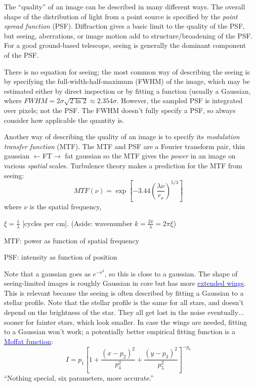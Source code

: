 \documentclass[12pt]{article}
\begin{document}
The ``quality'' of an image can be described in many different ways.
The overall shape of the distribution of light from a point source is
specified by the \emph{point spread function} (PSF). Diffraction gives a basic
limit to the quality of the PSF, but seeing, aberrations, or image
motion add to structure/broadening of the PSF\@. For a good ground-based
telescope, seeing is generally the dominant component of the PSF.

There is no equation for seeing;
the most common way of describing the seeing is by specifying
the full-width-half-maximum (FWHM) of the image, which may be
estimated either by direct inspection or by fitting a function
(usually a Gaussian, where $FWHM = 2\sigma\sqrt{2\ln{2}} \approx 2.354\sigma$.
However, the sampled PSF is integrated over pixels;
not the PSF\@. The FWHM doesn't fully specify a PSF,
so always consider how applicable the quantity is.

Another way of describing the quality of an image is to specify its
\emph{modulation transfer function} (MTF). The MTF and PSF are a Fourier
transform pair,
\textcolor{myBlue}
{thin gaussian $\leftarrow$\small FT\normalsize$\rightarrow$ fat gaussian}
so the MTF gives the \emph{power} in an image on various
\emph{spatial} scales. Turbulence theory makes a prediction for the MTF from
seeing:
    $$ MTF(\nu) = \exp\left[-3.44\left(\frac{\lambda\nu}{r_o}\right)
    ^{5/3}\right] $$
where $\nu$ is the spatial frequency,
\textcolor{myBlue}{$\xi = \frac{1}{\lambda}$ [cycles per cm].
(Aside: wavenumber $k = \frac{2\pi}{\lambda} = 2\pi\xi$)
\begin{itemize*}
    \item MTF: power as function of spatial frequency
    \item PSF: intensity as function of position
\end{itemize*}}

Note that a gaussian goes as $e^{-\nu^2}$, so this is close to a gaussian.
The shape of seeing-limited images is roughly Gaussian in core but has more
\href{http://astronomy.nmsu.edu/holtz/a535/html/diagrams/a535/racine2.htm}
{\textcolor{blue}{extended wings}}.
This is relevant because the seeing
is often described by fitting a Gaussian to a stellar profile.
\textcolor{myBlue}{Note that the stellar profile is the same for all
stars, and doesn't depend on the brightness of the star.
They all get lost in the noise eventually$\ldots$ sooner for fainter
stars, which look smaller.
In case the wings are needed, fitting to a Gaussian won't work;}
a potentially better empirical fitting function is a
\href{http://astronomy.nmsu.edu/holtz/a535/html/diagrams/a535/racine3.htm}
{\textcolor{blue}{Moffat function}}:
    $$  I=p_1\left[
    1+\frac{\left(x-p_2\right)^2}{p_4^2} +
      \frac{\left(y-p_3\right)^2}{p_5^2}\right]^{-p_6} $$
``Nothing special, six parameters, more accurate.''
\end{document}
